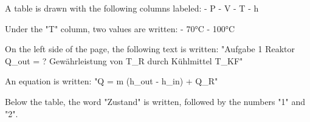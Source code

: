 A table is drawn with the following columns labeled:  
- P  
- V  
- T  
- h  

Under the "T" column, two values are written:  
- 70°C  
- 100°C  

On the left side of the page, the following text is written:  
"Aufgabe 1  
Reaktor  
Q_out = ?  
Gewährleistung von T_R durch Kühlmittel T_KF"  

An equation is written:  
"Q = m (h_out - h_in) + Q_R"  

Below the table, the word "Zustand" is written, followed by the numbers "1" and "2".